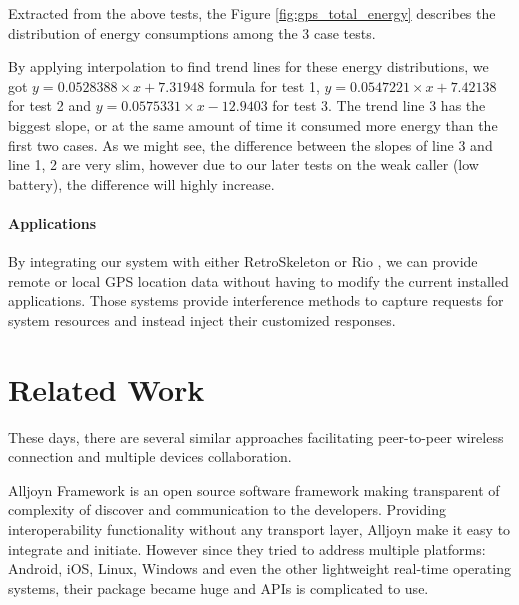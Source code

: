 \documentclass[conference]{IEEEtran}
\begin{document}
Extracted from the above tests, the Figure \ref{fig:gps_total_energy} describes the distribution of energy consumptions among the 3 case tests. 


By applying interpolation to find trend lines for these energy distributions, we got $y = 0.0528388 \times x + 7.31948$ formula for test 1, $y = 0.0547221 \times x + 7.42138$ for test 2 and $y = 0.0575331 \times x - 12.9403$ for test 3. The trend line 3 has the biggest slope, or at the same amount of time it consumed more energy than the first two cases. As we might see, the difference between the slopes of line 3 and line 1, 2 are very slim, however due to our later tests on the weak caller (low battery), the difference will highly increase. 

\paragraph{Applications}
By integrating our system with either RetroSkeleton \cite{retro-skel} or Rio \cite{rio}, we can provide remote or local GPS location data without having to modify the current installed applications. Those systems provide interference methods to capture requests for system resources and instead inject their customized responses. 

\section{Related Work}
\label{sec:related}
These days, there are several similar approaches facilitating peer-to-peer wireless connection and multiple devices collaboration. 

Alljoyn Framework \cite{alljoyn} is an open source software framework making transparent of complexity of discover and communication to the developers. Providing interoperability functionality without any transport layer, Alljoyn make it easy to integrate and initiate. However since they tried to address multiple platforms: Android, iOS, Linux, Windows and even the other lightweight real-time operating systems, their package became huge and APIs is complicated to use. 
\end{document}
